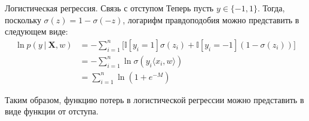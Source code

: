 \documentclass[notheorems, handout]{beamer}
\begin{document}
\begin{frame}{Логистическая регрессия. Связь с отступом}
	Теперь пусть $y\in\{-1, 1\}$. Тогда, поскольку $\sigma(z)=1-\sigma(-z)$, логарифм правдоподобия можно представить в следующем виде:
	\begin{align*}
		\ln p (y~|~ \mathbf{X}, w) & = -\sum_{i=1}^n\Big[\mathbb{I}[y_i=1]\sigma(z_i)+\mathbb{I}[y_i=-1]\left(1-\sigma(z_i)\right)\Big] \\
		                           & = -\sum_{i=1}^n \ln\sigma(y_i\langle x_i, w\rangle)                                                \\
		                           & = \sum_{i=1}^n \ln\left(1 + e^{-M}\right)
	\end{align*}

	Таким образом, функцию потерь в логистической регрессии можно представить в виде функции от отступа.
\end{frame}
\end{document}
